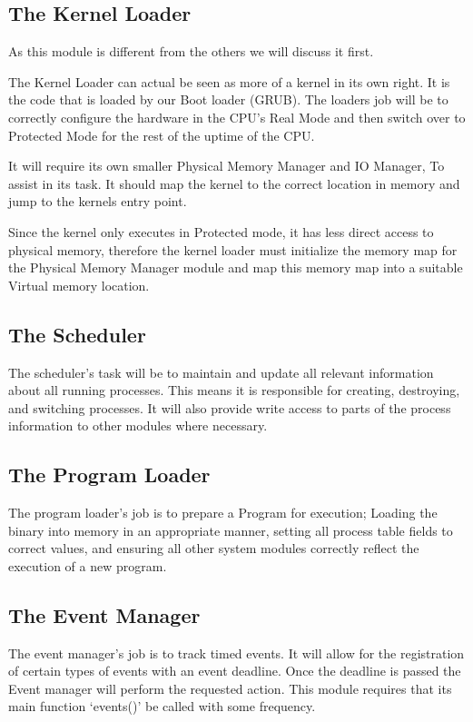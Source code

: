 \documentclass[a4paper]{report}
\begin{document}
\subsection{The Kernel Loader}

As this module is different from the others we will discuss it first.

The Kernel Loader can actual be seen as more of a kernel in its own right. It is the code that is loaded by our Boot loader (GRUB). The loaders job will be to correctly configure the hardware in the CPU's Real Mode and then switch over to Protected Mode for the rest of the uptime of the CPU.

It will require its own smaller Physical Memory Manager and IO Manager, To assist in its task. It should map the kernel to the correct location in memory and jump to the kernels entry point.

Since the kernel only executes in Protected mode, it has less direct access to physical memory, therefore the kernel loader must initialize the memory map for the Physical Memory Manager module and map this memory map into a suitable Virtual memory location.

\subsection{The Scheduler}

The scheduler's task will be to maintain and update all relevant information about all running processes. This means it is responsible for creating, destroying, and switching processes. It will also provide write access to parts of the process information to other modules where necessary.

\subsection{The Program Loader}

The program loader's job is to prepare a Program for execution; Loading the binary into memory in an appropriate manner, setting all process table fields to correct values, and ensuring all other system modules correctly reflect the execution of a new program.

\subsection{The Event Manager}

The event manager's job is to track timed events. It will allow for the registration of certain types of events with an event deadline. Once the deadline is passed the Event manager will perform the requested action. This module requires that its main function `events()' be called with some frequency.
\end{document}
